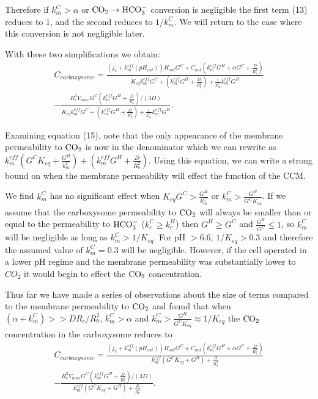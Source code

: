 \documentclass[]{article}
\begin{document}
Therefore if $k_m^C > \alpha$ or ${\rm CO_2}\rightarrow {\rm HCO_3^-}$ conversion is negligible the first term (13) reduces to 1, and the second reduces to $1/k_m^C$. We will return to the case where this conversion is not negligible later. 

With these two simplifications we obtain: 
\begin{multline}
	C_{carboxysome} = \frac{(j_c+k_m^{eff}(pH_{out}))H_{out}G^C +  C_{out} (k_m^{eff} G^H +\alpha G^C+\frac{D}{R_b^2})}
	{K_{eq} k_m^{eff} G^C  
		+ \left(k_m^{eff} G^H + \frac{D}{R_b^2}\right) 
		+ \frac{1}{k_m^C}  k_m^{eff} G^H} \\
	-\frac{R_c^3 V_{max}G^C(k_m^{eff} G^H + \frac{D}{R_b^2})/(3D)}
	{ K_{eq} k_m^{eff} G^C + \left(k_m^{eff} G^H + \frac{D}{R_b^2}\right) 
		+ \frac{1}{k_m^C} k_m^{eff} G^H}.
\end{multline}

Examining equation (15), note that the only appearance of the membrane permeability to ${\rm CO_2}$ is now in the denominator which we can rewrite as $  k_m^{eff}(G^C K_{eq}+ \frac{G^H}{k_m^C})  + \left(k_m^{eff} G^H + \frac{D}{R_b^2}\right) $. Using this equation, we can write a strong bound on when the membrane permeability will effect the function of the CCM. 

We find $k_m^C$ has no significant effect when $K_{eq}G^C > \frac{G^H}{k_m^C}$ or $ k_m^C > \frac{G^H}{G^C K_{eq}}$. If we assume that the carboxysome permeability to ${\rm CO_2}$ will always be smaller than or equal to the permeability to ${\rm HCO_3^-}$ ($k_c^C\geq k_c^H$) then $G^H \geq G^C$ and $\frac{G^H}{G^C} \leq 1$, so $k_m^C$ will be negligible as long as $k_m^C > 1/K_{eq}$. For pH $> 6.6$, $1/K_{eq} > 0.3$ and therefore the assumed value of $k_m^C=0.3$ will be negligible. However, if the cell operated in a lower pH regime and the membrane permeability was substantially lower to $CO_2$ it would begin to effect the ${\rm CO_2}$ concentration. 

Thus far we have made a series of observations about the size of terms compared to the membrane permeability to ${\rm CO_2}$ and found that when $(\alpha +k_m^C)>> D R_c/R_b^2$, $k_m^C > \alpha$ and $ k_m^C > \frac{G^H}{G^C K_{eq}} \approx 1/K_{eq}$ the ${\rm CO_2}$ concentration in the carboxysome reduces to 
\begin{multline}
C_{carboxysome} = \frac{(j_c+k_m^{eff}(pH_{out}))H_{out}G^C +  C_{out} (k_m^{eff} G^H +\alpha G^C+\frac{D}{R_b^2})}
	{k_m^{eff}(G^C K_{eq} +  G^H) + \frac{D}{R_b^2} }\\
-\frac{R_c^3 V_{max}G^C(k_m^{eff} G^H + \frac{D}{R_b^2})/(3D)}
	{k_m^{eff}(G^C K_{eq} +  G^H) + \frac{D}{R_b^2} }.
\end{multline}
\end{document}
